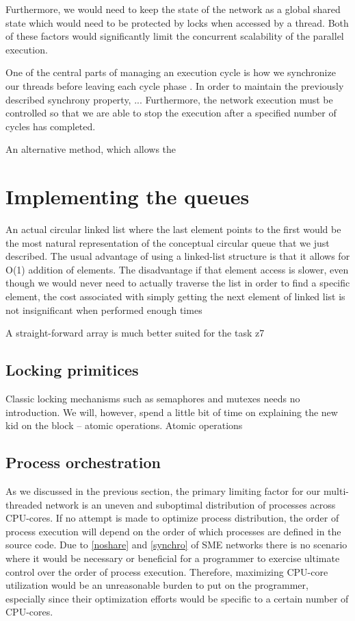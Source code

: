 Furthermore, we would need to keep the state of the network
as a global shared state which would need to be protected by locks
when accessed by a thread. Both of these factors would significantly
limit the concurrent scalability of the parallel execution. 

One of the central parts of managing an execution cycle is how we
synchronize our threads before leaving each cycle phase
. In order to maintain the previously described
synchrony property, ... Furthermore, the network execution must be
controlled so that we are able to stop the execution after a specified
number of cycles has completed.


An alternative method, which allows the 

\section{Implementing the queues}
An actual circular linked list where the last element points to the
first would be the most natural representation of the conceptual
circular queue that we just described. The usual advantage of using a
linked-list structure is that it allows for O(1) addition of
elements. The disadvantage if that element access is slower, even
though we would never need to actually traverse the list in order to
find a specific element, the cost associated with simply getting the
next element of linked list is not insignificant when performed enough
times 

A straight-forward array is much better suited for the task z7

\subsection{Locking primitices}
Classic locking mechanisms such as semaphores and mutexes needs no
introduction. We will, however, spend a little bit of time on
explaining the new kid on the block -- atomic operations.  Atomic
operations 

\subsection{Process orchestration}
As we discussed in the previous section, the primary limiting factor
for our multi-threaded network is an uneven and suboptimal
distribution of processes across CPU-cores. If no attempt is made to
optimize process distribution, the order of process execution will
depend on the order of which processes are defined in the source
code. Due to \cref{noshare} and \cref{synchro} of SME
networks there is no scenario where it would be necessary or
beneficial for a programmer to exercise ultimate control over the
order of process execution. Therefore, maximizing CPU-core utilization
would be an unreasonable burden to put on the programmer, especially
since their optimization efforts would be specific to a certain number
of CPU-cores.

